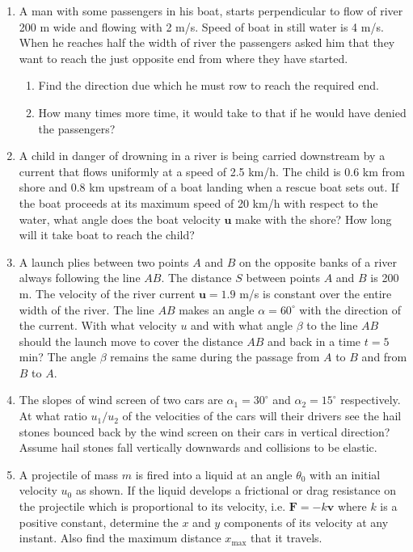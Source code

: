 \documentclass{article}
\begin{document}
\begin{enumerate}
    \item A man with some passengers in his boat, starts perpendicular to flow of river 200 m wide and flowing with 2 m/s. Speed of boat in still water is 4 m/s. When he reaches half the width of river the passengers asked him that they want to reach the just opposite end from where they have started.
    \begin{enumerate}
        \item Find the direction due which he must row to reach the required end.
        \item How many times more time, it would take to that if he would have denied the passengers?
    \end{enumerate}
    
    \item A child in danger of drowning in a river is being carried downstream by a current that flows uniformly at a speed of 2.5 km/h. The child is 0.6 km from shore and 0.8 km upstream of a boat landing when a rescue boat sets out. If the boat proceeds at its maximum speed of 20 km/h with respect to the water, what angle does the boat velocity \( \mathbf{u} \) make with the shore? How long will it take boat to reach the child?
    
    \item A launch plies between two points \( A \) and \( B \) on the opposite banks of a river always following the line \( AB \). The distance \( S \) between points \( A \) and \( B \) is 200 m. The velocity of the river current \( \mathbf{u} = 1.9 \) m/s is constant over the entire width of the river. The line \( AB \) makes an angle \( \alpha = 60^\circ \) with the direction of the current. With what velocity \( u \) and with what angle \( \beta \) to the line \( AB \) should the launch move to cover the distance \( AB \) and back in a time \( t = 5 \) min? The angle \( \beta \) remains the same during the passage from \( A \) to \( B \) and from \( B \) to \( A \).
    
    \item The slopes of wind screen of two cars are \( \alpha_1 = 30^\circ \) and \( \alpha_2 = 15^\circ \) respectively. At what ratio \( u_1/u_2 \) of the velocities of the cars will their drivers see the hail stones bounced back by the wind screen on their cars in vertical direction? Assume hail stones fall vertically downwards and collisions to be elastic.
    
    \item A projectile of mass \( m \) is fired into a liquid at an angle \( \theta_0 \) with an initial velocity \( u_0 \) as shown. If the liquid develops a frictional or drag resistance on the projectile which is proportional to its velocity, i.e. \( \mathbf{F} = -k\mathbf{v} \) where \( k \) is a positive constant, determine the \( x \) and \( y \) components of its velocity at any instant. Also find the maximum distance \( x_{\text{max}} \) that it travels.
    \begin{center}
    \end{center}
    

\end{enumerate}
\end{document}
